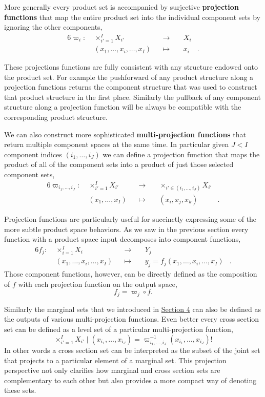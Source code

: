 \documentclass[
  letterpaper,
  DIV=11,
  numbers=noendperiod]{scrartcl}
\begin{document}
More generally every product set is accompanied by surjective
\textbf{projection functions} that map the entire product set into the
individual component sets by ignoring the other components,
\begin{alignat*}{6}
\varpi_{i} :\; & \times_{i' = 1}^{I} X_{i'} & &\rightarrow& \; & X_{i} &
\\
& (x_{1}, \ldots, x_{i}, \ldots, x_{I}) & &\mapsto& & x_{i} &.
\end{alignat*}

These projections functions are fully consistent with any structure
endowed onto the product set. For example the pushforward of any product
structure along a projection functions returns the component structure
that was used to construct that product structure in the first place.
Similarly the pullback of any component structure along a projection
function will be always be compatible with the corresponding product
structure.

We can also construct more sophisticated \textbf{multi-projection
functions} that return multiple component spaces at the same time. In
particular given \(J < I\) component indices
\(( i_{1}, \ldots, i_{J} )\) we can define a projection function that
maps the product of all of the component sets into a product of just
those selected component sets, \begin{alignat*}{6}
\varpi_{i_{1}, \ldots, i_{J}} :\; & \times_{i' = 1}^{I} X_{i'} & &\rightarrow& \;
& \times_{ i' \in ( i_{1}, \ldots, i_{J} ) } X_{i'} &
\\
& (x_{1}, \ldots, x_{I}) & &\mapsto& & (x_{i}, x_{j}, x_{k}) &.
\end{alignat*}

Projection functions are particularly useful for succinctly expressing
some of the more subtle product space behaviors. As we saw in the
previous section every function with a product space input decomposes
into component functions, \begin{alignat*}{6}
f_{j} :\; & \times_{i = 1}^{I} X_{i} & &\rightarrow& \; & Y_{j} &
\\
& (x_{1}, \ldots, x_{i}, \ldots, x_{I}) & &\mapsto&
& y_{j} = f_{j}(x_{1}, \ldots, x_{i}, \ldots, x_{I}) &.
\end{alignat*} Those component functions, however, can be directly
defined as the composition of \(f\) with each projection function on the
output space, \[
f_{j} = \varpi_{j} \circ f.
\]

Similarly the marginal sets that we introduced in
\href{@sec:decomposition}{Section 4} can also be defined as the outputs
of various multi-projection functions. Even better every cross section
set can be defined as a level set of a particular multi-projection
function, \[
\times_{i' = 1}^{I} X_{i'} \mid (x_{i_{1}}, \ldots, x_{i_{J}})
=
\varpi_{i_{1}, \ldots, i_{J}}^{-1}(x_{i_{1}}, \ldots, x_{i_{J}})!
\] In other words a cross section set can be interpreted as the subset
of the joint set that projects to a particular element of a marginal
set. This projection perspective not only clarifies how marginal and
cross section sets are complementary to each other but also provides a
more compact way of denoting these sets.
\end{document}
